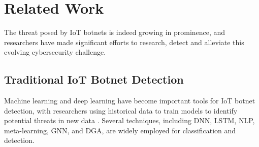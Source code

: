 \documentclass[journal]{IEEEtai}
\begin{document}
\section{Related Work}
\begin{table}[!h]
\centering
\caption{Work Related to IoT Botnet Lifecycle Detection.}
\label{table1}
\end{table}



The threat posed by IoT botnets is indeed growing in prominence, and researchers have made significant efforts to research, detect and alleviate this evolving cybersecurity challenge.

\subsection{Traditional IoT Botnet Detection}
\label{Traditional IoT Botnet Detection}

Machine learning and deep learning have become important tools for IoT botnet detection, with researchers using historical data to train models to identify potential threats in new data \cite{9813378, 9645219}.
Several techniques, including DNN\cite{20203909247872, 9499122}, LSTM\cite{9241019}, NLP\cite{20175004517021}, meta-learning\cite{WOS:000982455700011}, GNN\cite{9850373}, and DGA\cite{20225213302122, 10190603}, are widely employed for classification and detection.
\end{document}
